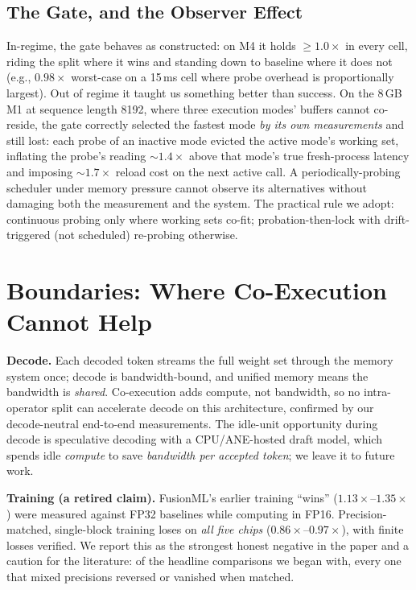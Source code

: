 \documentclass{article}
\newcommand{\sys}{FusionML}
\newcommand{\x}[1]{$#1\times$}
\begin{document}
\subsection{The Gate, and the Observer Effect}
\label{sec:gate}

In-regime, the gate behaves as constructed: on M4 it holds $\ge$\x{1.0} in
every cell, riding the split where it wins and standing down to baseline
where it does not (e.g., \x{0.98} worst-case on a 15\,ms cell where probe
overhead is proportionally largest). Out of regime it taught us something
better than success. On the 8\,GB M1 at sequence length 8192, where
three execution modes' buffers cannot co-reside, the gate correctly
selected the fastest mode \emph{by its own measurements} and still lost:
each probe of an inactive mode evicted the active mode's working set,
inflating the probe's reading $\sim$\x{1.4} above that mode's true
fresh-process latency and imposing $\sim$\x{1.7} reload cost on the next
active call. A periodically-probing scheduler under memory pressure cannot
observe its alternatives without damaging both the measurement and the
system. The practical rule we adopt: continuous probing only where working
sets co-fit; probation-then-lock with drift-triggered (not scheduled)
re-probing otherwise.

\section{Boundaries: Where Co-Execution Cannot Help}
\label{sec:boundaries}

\textbf{Decode.} Each decoded token streams the full weight set through the
memory system once; decode is bandwidth-bound, and unified memory means the
bandwidth is \emph{shared}. Co-execution adds compute, not bandwidth, so no
intra-operator split can accelerate decode on this architecture, confirmed
by our decode-neutral end-to-end measurements. The idle-unit
opportunity during decode is speculative decoding with a CPU/ANE-hosted
draft model, which spends idle \emph{compute} to save \emph{bandwidth per
accepted token}; we leave it to future work.

\textbf{Training (a retired claim).} \sys's earlier training ``wins''
(\x{1.13}--\x{1.35}) were measured against FP32 baselines while computing
in FP16. Precision-matched, single-block training loses on \emph{all five
chips} (\x{0.86}--\x{0.97}), with finite losses verified. We report this as
the strongest honest negative in the paper and a caution for the
literature: of the headline comparisons we began with, every one that mixed
precisions reversed or vanished when matched.
\end{document}
